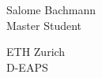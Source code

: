 \documentclass[11pt,aspectratio=169]{beamer}
\begin{document}

	
	




\begin{closingframe}

Salome Bachmann\\
Master Student\\

\medskip

ETH Zurich\\
D-EAPS\\

\end{closingframe}



	


			
\end{document}
